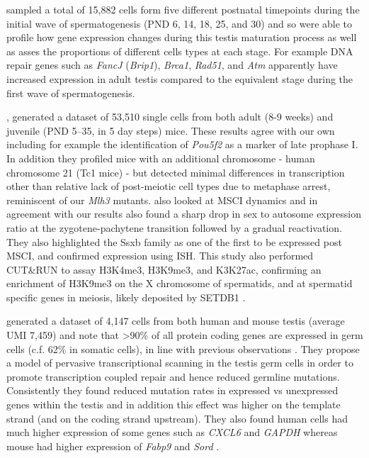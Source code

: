 \cite{Grive2019Dynamic} sampled a total of 15,882 cells form five different postnatal timepoints during the initial wave of spermatogenesis (PND 6, 14, 18, 25, and 30) and so were able to profile how gene expression changes during this testis maturation process as well as asses the proportions of different cells types at each stage. For example DNA repair genes such as \textit{FancJ} (\textit{Brip1}), \textit{Brca1}, \textit{Rad51}, and \textit{Atm} apparently have increased expression in adult testis compared to the equivalent stage during the first wave of spermatogenesis.

\cite{Ernst2019Staged}, generated a dataset of 53,510 single cells from both adult (8-9 weeks) and juvenile (PND 5–35, in 5 day steps) mice. These results agree with our own including for example the identification of \textit{Pou5f2} as a marker of late prophase I. In addition they profiled mice with an additional chromosome - human chromosome 21 (Tc1 mice) - but detected minimal differences in transcription other than relative lack of post-meiotic cell types due to metaphase arrest, reminiscent of our \textit{Mlh3} mutants. \cite{Ernst2019Staged} also looked at MSCI dynamics and in agreement with our results also found a sharp drop in sex to autosome expression ratio at the zygotene-pachytene transition followed by a gradual reactivation. They also highlighted the Ssxb family as one of the first to be expressed post MSCI, and confirmed expression using ISH. This study also performed CUT\&RUN to assay H3K4me3, H3K9me3, and K3K27ac, confirming an enrichment of H3K9me3 on the X chromosome of spermatids, and at spermatid specific genes in meiosis, likely deposited by SETDB1 \parencite{Hirota2018SETDB1}.

\cite{Xia2019Widespread} generated a dataset of 4,147 cells from both human and mouse testis (average UMI 7,459) and note that >90\% of all protein coding genes are expressed in germ cells (c.f. 62\% in somatic cells), in line with previous observations \parencite{Soumillon2013Cellular, Schmidt1996Transcriptional}. They propose a model of pervasive transcriptional scanning in the testis germ cells in order to promote transcription coupled repair and hence reduced germline mutations. Consistently they found reduced mutation rates in expressed vs unexpressed genes within the testis and in addition this effect was higher on the template strand (and on the coding strand upstream). They also found human cells had much higher expression of some genes such as \textit{CXCL6} and \textit{GAPDH} whereas mouse had higher expression of \textit{Fabp9} and \textit{Sord} \parencite{Xia2019Widespread}.

